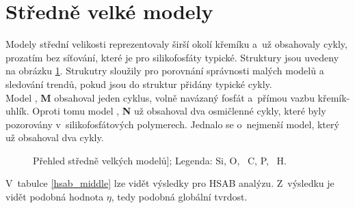 \documentclass[
digital, %
table,   %
nolof,     %
nolot,     %
oneside,
]{fithesis3}
\renewcommand{\thesubfigure}{}
\begin{document}
\section{Středně velké modely}
Modely střední velikosti reprezentovaly širší okolí křemíku a~už obsahovaly cykly, prozatím bez síťování, které je pro silikofosfáty typické. Struktury jsou uvedeny na obrázku \ref{prehled_middle}. Strukutry sloužily pro porovnání správnosti malých modelů a sledování trendů, pokud jsou do struktur přidány typické cykly. \\
Model , \textbf{M} obsahoval jeden cyklus, volně navázaný fosfát a~přímou vazbu křemík-uhlík. Oproti tomu model , \textbf{N} už obsahoval dva osmičlenné cykly, které byly pozorovány v~silikofosfátových polymerech. Jednalo se o~nejmenší model, který už obsahoval dva cykly.
\renewcommand{\thesubfigure}{}
\begin{figure}
\begin{center}
\caption{Přehled středně velkých modelů];  Legenda:  Si,  O, ~C,  P, ~H.}
\label{prehled_middle}
\end{center}
\end{figure}
V~tabulce \ref{hsab_middle} lze vidět výsledky pro HSAB analýzu. Z~výsledku je vidět podobná hodnota $\eta$, tedy podobná globální tvrdost.
\end{document}
